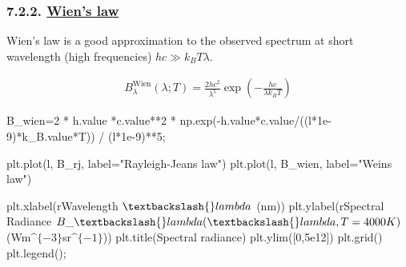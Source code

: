 \documentclass[
  letterpaper,
  DIV=11,
  numbers=noendperiod]{scrartcl}
\newenvironment{Shaded}{\begin{snugshade}}{\end{snugshade}}
\newcommand{\DecValTok}[1]{\textcolor[rgb]{0.68,0.00,0.00}{#1}}
\newcommand{\FloatTok}[1]{\textcolor[rgb]{0.68,0.00,0.00}{#1}}
\newcommand{\NormalTok}[1]{\textcolor[rgb]{0.00,0.23,0.31}{#1}}
\newcommand{\OperatorTok}[1]{\textcolor[rgb]{0.37,0.37,0.37}{#1}}
\newcommand{\StringTok}[1]{\textcolor[rgb]{0.13,0.47,0.30}{#1}}
\newcommand{\VerbatimStringTok}[1]{\textcolor[rgb]{0.13,0.47,0.30}{#1}}
\begin{document}
\hypertarget{wiens-law}{%
\subsubsection{\texorpdfstring{7.2.2. \protect\hyperlink{toc0_}{Wien's
law}}{7.2.2. Wien's law}}\label{wiens-law}}

Wien's law is a good approximation to the observed spectrum at short
wavelength (high frequencies) \(hc\gg k_BT\lambda\).

\begin{align}
B_\lambda^\mathrm{Wien}(\lambda; T) = \frac{2 hc^2}{\lambda^5}\exp\left(-\frac{hc}{\lambda k_B T}\right)
\end{align}

\begin{Shaded}
\begin{Highlighting}[]
\NormalTok{B\_wien}\OperatorTok{=}\DecValTok{2} \OperatorTok{*}\NormalTok{ h.value }\OperatorTok{*}\NormalTok{c.value}\OperatorTok{**}\DecValTok{2} \OperatorTok{*}\NormalTok{ np.exp(}\OperatorTok{{-}}\NormalTok{h.value}\OperatorTok{*}\NormalTok{c.value}\OperatorTok{/}\NormalTok{((l}\OperatorTok{*}\FloatTok{1e{-}9}\NormalTok{)}\OperatorTok{*}\NormalTok{k\_B.value}\OperatorTok{*}\NormalTok{T)) }\OperatorTok{/}\NormalTok{ (l}\OperatorTok{*}\FloatTok{1e{-}9}\NormalTok{)}\OperatorTok{**}\DecValTok{5}\OperatorTok{;}
\end{Highlighting}
\end{Shaded}

\begin{Shaded}
\begin{Highlighting}[]
\NormalTok{plt.plot(l, B\_rj, label}\OperatorTok{=}\StringTok{"Rayleigh{-}Jeans law"}\NormalTok{)}
\NormalTok{plt.plot(l, B\_wien, label}\OperatorTok{=}\StringTok{"Wein\textquotesingle{}s law"}\NormalTok{)}

\NormalTok{plt.xlabel(}\VerbatimStringTok{r\textquotesingle{}Wavelength $\textbackslash{}lambda$ (nm)\textquotesingle{}}\NormalTok{)}
\NormalTok{plt.ylabel(}\VerbatimStringTok{r\textquotesingle{}Spectral Radiance $B\_\textbackslash{}lambda(\textbackslash{}lambda, T=4000K)$ (Wm$\^{}\{{-}3\}$sr$\^{}\{{-}1\}$)\textquotesingle{}}\NormalTok{)}
\NormalTok{plt.title(}\StringTok{\textquotesingle{}Spectral radiance\textquotesingle{}}\NormalTok{)}
\NormalTok{plt.ylim([}\DecValTok{0}\NormalTok{,}\FloatTok{5e12}\NormalTok{])}
\NormalTok{plt.grid()}
\NormalTok{plt.legend()}\OperatorTok{;}
\end{Highlighting}
\end{Shaded}
\end{document}
